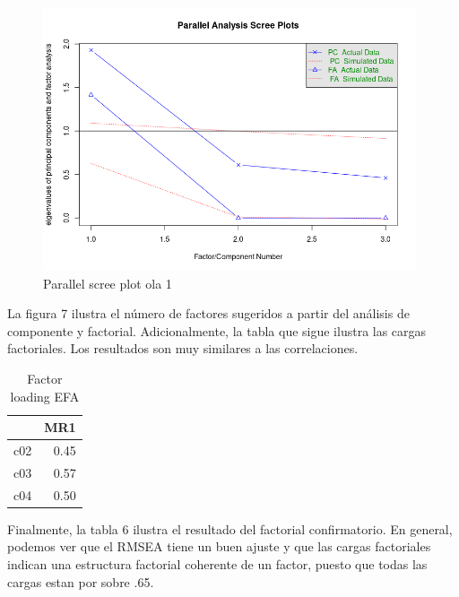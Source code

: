 \begin{figure}[H]
    \centering
    \includegraphics[width=11cm]{output/scree_plots1.png}
    \caption{Parallel scree plot ola 1}
    \label{fig:scree1}
\end{figure}

La figura 7 ilustra el número de factores sugeridos a partir del análisis de componente y factorial. Adicionalmente, la tabla que sigue ilustra las cargas factoriales. Los resultados son muy similares a las correlaciones. 


\begin{table}[H]
\centering
\caption{Factor loading EFA}
\begin{tabular}{rr}
  \hline
 & MR1 \\ 
  \hline
c02 & 0.45 \\ 
  c03 & 0.57 \\ 
  c04 & 0.50 \\ 
   \hline
\end{tabular}
\end{table}

Finalmente, la tabla 6 ilustra el resultado del factorial confirmatorio. En general, podemos ver que el RMSEA tiene un buen ajuste y que las cargas factoriales indican una estructura factorial coherente de un factor, puesto que todas las cargas estan por sobre .65. 


